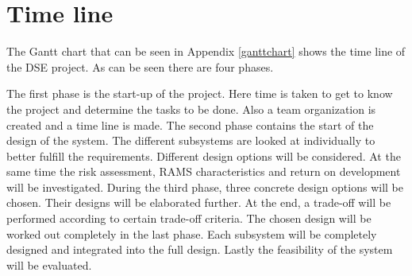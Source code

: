 \section{Time line}
\label{dsePPTimeline}
The Gantt chart that can be seen in Appendix \ref{ganttchart}
shows the time line of the DSE project.
As can be seen there are four phases. 

The first phase is the start-up of the project. Here time is taken to get to know the project and
determine the tasks to be done. Also a team organization is created and a time line is made.
The second phase contains the start of the design of the system. The different subsystems are looked 
at individually to better fulfill the requirements. Different design options will be considered.
At the same time the risk assessment, RAMS characteristics and return on development will be investigated.
During the third phase, three concrete design options will be chosen. Their designs will be elaborated further.
At the end, a trade-off will be performed according to certain trade-off criteria.
The chosen design will be worked out completely in the last phase. Each subsystem will be completely designed
and integrated into the full design. Lastly the feasibility of the system will be evaluated.